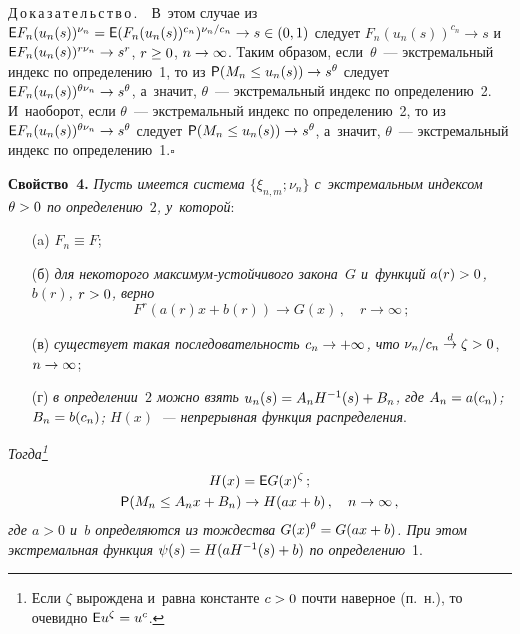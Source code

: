 \begin{multicols}{2}
\smallskip


\noindent
Д\,о\,к\,а\,з\,а\,т\,е\,л\,ь\,с\,т\,в\,о\,.\ \
В~этом случае из
${\sf E}F_n(u_n(s))^{\nu_n}\hm={\sf E}(F_n(u_n(s))^{c_n})^{\nu_n/c_n}
\hm\to s\hm\in (0,1)$ следует $F_n(u_n(s))^{c_n}\to s$
и~${\sf E}F_n(u_n(s))^{r\nu_n}\hm\to s^r$, $r\hm\ge 0$, $n\hm\to\infty$.
Таким образом, если~$\theta$~--- экстремальный индекс
по определению~1, то из ${\sf P}(M_n\le u_n(s))\hm\to s^\theta$ следует
${\sf E}F_n(u_n(s))^{\theta\nu_n}\hm\to s^\theta$, а~значит, $\theta$~---
экстремальный индекс по определению~2. И~наоборот, если $\theta$~---
экстремальный индекс
по определению~2, то из ${\sf E}F_n(u_n(s))^{\theta\nu_n}\hm\to s^\theta$ следует
${\sf P}(M_n\le u_n(s))\hm\to s^\theta$, а~значит, $\theta$~--- экстремальный индекс
по определению~1.\hfill$\square$

\smallskip

\noindent
\textbf{Свойство~4.} \textit{Пусть имеется система $\{\xi_{n,m};\nu_n\}$
с~экстремальным индексом $\theta\hm>0$ по определению~$2$, у~которой}:
\begin{enumerate}
\item[(a)] $F_n\equiv F$;
\item[(б)] \textit{для некоторого мак\-си\-мум-устой\-чи\-во\-го закона~$G$ и~функций
$a(r)\hm>0$, $b(r)$, $r\hm>0$, верно}
$$
F^r(a(r)x+b(r))\to G(x)\,,\quad r\to\infty\,;
$$

\item[(в)] \textit{существует такая последовательность $c_n\hm\to +\infty$,
что} $\nu_n/c_n\stackrel{d}{\to}\zeta\hm>0$, $n\hm\to\infty$;

\item[(г)] \textit{в определении~$2$ можно взять
$u_n(s)\hm=A_nH^{-1}(s)\hm+B_n$, где $A_n\hm=a(c_n)$; $B_n\hm=b(c_n)$;
$H(x)$~--- непрерывная функция распределения}.
\end{enumerate}


\textit{Тогда\footnote{Если $\zeta$ вырождена и~равна константе $c\hm>0$ почти наверное 
(п.~н.),
то очевидно ${\sf E}u^\zeta\hm=u^c$.} 
\begin{gather*}
H(x)={\sf E}G(x)^\zeta\,;
\\
{\sf P}(M_n\le A_nx+B_n)\to H(ax+b)\,,\quad n\to\infty\,,
\end{gather*}
где $a>0$ и~$b$ определяются из тождества $G(x)^\theta\hm=G(ax\hm+b)$.
При этом экстремальная функция $\psi(s)\hm=H(aH^{-1}(s)\hm+b)$ по определению}~1.

\smallskip


\end{multicols}
